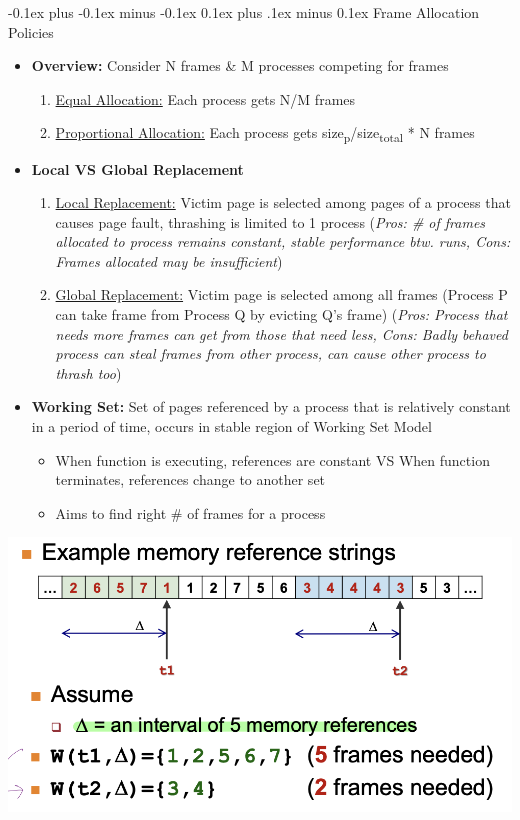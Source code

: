 \documentclass[landscape]{article}
\makeatletter
\renewcommand{\subsection}{\@startsection{subsection}{2}{0mm}%
  {-0.1ex plus -0.1ex minus -0.1ex}%
  {0.1ex plus .1ex minus 0.1ex}%
{\normalfont\scriptsize\bfseries}}
\makeatother
\begin{document}
\begin{multicols*}{6}
    \subsection{Frame Allocation Policies}
    \begin{itemize}
      \item \textbf{Overview:} Consider N frames \& M processes competing for frames
      \begin{enumerate}
        \item \underline{Equal Allocation:} Each process gets N/M frames
        \item \underline{Proportional Allocation:} Each process gets size\textsubscript{p}/size\textsubscript{total} * N frames
      \end{enumerate}
      \item \textbf{Local VS Global Replacement}
      \begin{enumerate}
        \item \underline{Local Replacement:} Victim page is selected among pages of a process that causes page fault, thrashing is limited to 1 process (\textit{Pros: \# of frames allocated to process remains constant, stable performance btw. runs, Cons: Frames allocated may be insufficient})
        \item \underline{Global Replacement:} Victim page is selected among all frames (Process P can take frame from Process Q by evicting Q's frame) (\textit{Pros: Process that needs more frames can get from those that need less, Cons: Badly behaved process can steal frames from other process, can cause other process to thrash too})
      \end{enumerate}
      \item \textbf{Working Set:} Set of pages referenced by a process that is relatively constant in a period of time, occurs in stable region of Working Set Model
      \begin{itemize}
        \item When function is executing, references are constant VS When function terminates, references change to another set
        \item Aims to find right \# of frames for a process
      \end{itemize}
    \end{itemize}
    \includegraphics[width=0.8\linewidth]{20_working_set.png}


\end{multicols*}
\end{document}
